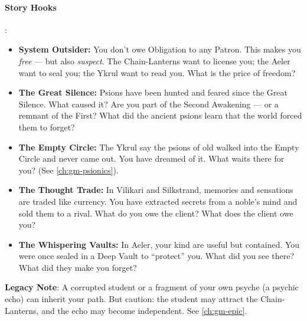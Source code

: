 \paragraph{Story Hooks}:
\begin{itemize}
\item \textbf{System Outsider:} You don't owe Obligation to any Patron. This makes you \emph{free} --- but also \emph{suspect}. The Chain-Lanterns want to license you; the Aeler want to seal you; the Ykrul want to read you. What is the price of freedom?
\item \textbf{The Great Silence:} Psions have been hunted and feared since the Great Silence. What caused it? Are you part of the Second Awakening --- or a remnant of the First? What did the ancient psions learn that the world forced them to forget?
\item \textbf{The Empty Circle:} The Ykrul say the psions of old walked into the Empty Circle and never came out. You have dreamed of it. What waits there for you? (See \ref{ch:gm-psionics}).
\item \textbf{The Thought Trade:} In Vilikari and Silkstrand, memories and sensations are traded like currency. You have extracted secrets from a noble's mind and sold them to a rival. What do you owe the client? What does the client owe you?
\item \textbf{The Whispering Vaults:} In Aeler, your kind are useful but contained. You were once sealed in a Deep Vault to ``protect'' you. What did you see there? What did they make you forget?
\end{itemize}

\textbf{Legacy Note}: A corrupted student or a fragment of your own psyche (a psychic echo) can inherit your path. But caution: the student may attract the Chain-Lanterns, and the echo may become independent. See \ref{ch:gm-epic}.

